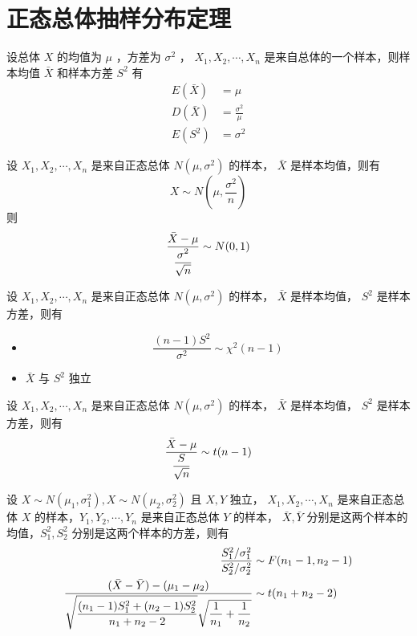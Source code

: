 \section{正态总体抽样分布定理}

\noindent 设总体 $ X $ 的均值为 $ \mu $ ，方差为 $ \sigma^2 $ ， $ X_1, X_2, \cdots, X_n $ 是来自总体的一个样本，则样本均值 $ \bar{X} $
和样本方差 $ S^2 $ 有
\begin{align}
    E(\bar{X}) & = \mu \\
    D(\bar{X}) & = \frac{\sigma^2}{\mu} \\
    E(S^2) & = \sigma^2
\end{align}

 设 $ X_1, X_2, \cdots, X_n $ 是来自正态总体 $ N(\mu, \sigma^2) $ 的样本， $ \bar{X} $ 是样本均值，则有
\begin{equation}
    X \sim N\left(\mu, \frac{\sigma^2}{n}\right)
\end{equation}
则
\begin{equation}
    \frac{\bar{X} - \mu}{\displaystyle{\frac{\displaystyle{\sigma^2}}{\displaystyle{\sqrt{n}}}}} \sim N(0,1)
\end{equation}

 设 $ X_1, X_2, \cdots, X_n $ 是来自正态总体 $ N(\mu, \sigma^2) $ 的样本， $ \bar{X} $ 是样本均值，
$ S^2 $ 是样本方差，则有
\begin{itemize}[leftmargin=\paritemindent]
    \item \begin{equation}
        \frac{(n-1)S^2}{\sigma^2} \sim \chi^2(n-1)
    \end{equation}
    \item $ \bar{X} $ 与 $ S^2 $ 独立
\end{itemize}


 设 $ X_1, X_2, \cdots, X_n $ 是来自正态总体 $ N(\mu, \sigma^2) $ 的样本， $ \bar{X} $ 是样本均值，
$ S^2 $ 是样本方差，则有
\begin{equation}
    \frac{\bar{X} - \mu}{\displaystyle{\frac{\displaystyle{S}}{\displaystyle{\sqrt{n}}}}} \sim t(n-1)
\end{equation}

 设 $ X\sim N(\mu_1, \sigma_{1}^{2}), X\sim N(\mu_2, \sigma_{2}^{2}) $ 且 $ X,Y $ 独立，
$ X_1, X_2, \cdots, X_n $ 是来自正态总体 $ X $ 的样本，$ Y_1, Y_2, \cdots, Y_n $ 是来自正态总体 $ Y $ 的样本，
$ \bar{X},\bar{Y} $ 分别是这两个样本的均值，$ S_{1}^{2}, S_{2}^{2} $ 分别是这两个样本的方差，则有
\begin{align}
    \frac{S_{1}^{2}/\sigma_{1}^{2}}{S_{2}^{2}/\sigma_{2}^{2}} & \sim F(n_1 - 1,n_2 -1) \\
    \displaystyle{\frac{\displaystyle{(\bar{X} - \bar{Y}) - (\mu_1 - \mu_2)}}{\displaystyle{
        \sqrt{\frac{(n_1 - 1)S_{1}^{2} + (n_2 - 1)S_{2}^{2}}{n_1 + n_2 - 2}}
        \sqrt{\frac{1}{n_1} + \frac{1}{n_2}}
    }}} & \sim t(n_1 + n_2 - 2)
\end{align}

